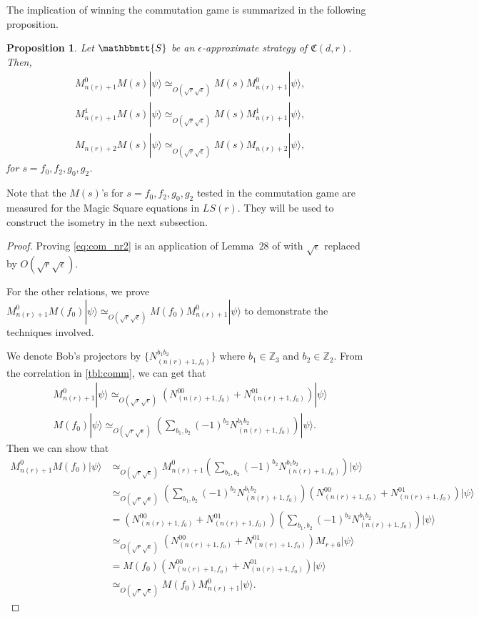 \documentclass[11pt,letterpaper]{article}
\newcommand{\ket}[1]{|#1\rangle}
\newcommand{\Z}{\mathbb{Z}}
\newcommand{\1}{\mathbb{1}}
\newcommand{\LS}{LS}
\newcommand{\nr}{n(r)}
\newcommand{\fC}{\mathfrak{C}}
\newcommand{\bS}{\mathbbmtt{S}}
\newcommand{\ep}{\epsilon}
\newcommand{\se}{\sqrt{\epsilon}}
\newcommand{\sr}{\sqrt{r}}
\newcommand{\appd}[1]{\simeq_{#1}}
\newtheorem{proposition}[theorem]{Proposition}
\theoremstyle{definition}
\begin{document}
The implication of winning the commutation game is summarized in the following proposition.
\begin{proposition}
	\label{prop:rel_comm}
	Let $\bS$ be an $\ep$-approximate strategy of $\fC(d,r)$.
	Then, 
	\begin{align}
		&M_{\nr+1}^0 M(s) \ket{\psi} \appd{O(\sr \se)} M(s) M_{\nr+1}^0 \ket{\psi},\\ 
		&M_{\nr+1}^1 M(s) \ket{\psi} \appd{O(\sr \se)} M(s) M_{\nr+1}^1 \ket{\psi}, \\
		\label{eq:com_nr2} &M_{\nr+2} M(s) \ket{\psi} \appd{O(\sr \se)} M(s) M_{\nr+2} \ket{\psi},
	\end{align}
	for $s = f_0, f_2,g_0,g_2$.
\end{proposition}
Note that the $M(s)$'s for $s = f_0, f_2,g_0,g_2$ tested in the commutation game are measured for the Magic Square equations in $\LS(r)$.
They will be used to construct the isometry in the next subsection.
\begin{proof}
	Proving \cref{eq:com_nr2} is an application of Lemma~$28$ of \cite{coladan2017verifier} with $\se$ replaced by $O(\sr \se)$.
	
	For the other relations, we prove $M_{\nr+1}^0M(f_0) \ket{\psi} \appd{O(\sr \se)} M(f_0)M_{\nr+1}^0 \ket{\psi}$ to demonstrate 
	the techniques involved. 
	
	We denote Bob's projectors by $\{ N_{(\nr+1, f_0)}^{b_1 b_2} \}$ where $b_1 \in \Z_3$ and
	$b_2 \in \Z_2$. From the correlation in \cref{tbl:comm}, 
	we can get that 
	\begin{align*}
		&M_{\nr+1}^0 \ket{\psi} \appd{O(\sr \se)} 
		(N_{(\nr+1, f_0)}^{00} + N_{(\nr+1, f_0)}^{01}) \ket{\psi} \\
		&M(f_0) \ket{\psi} \appd{O(\sr \se)} 
		(\sum_{b_1, b_2} (-1)^{b_2} N_{(\nr+1, f_0)}^{b_1b_2})\ket{\psi}.
	\end{align*}
	Then we can show that
	\begin{align*}
		M_{\nr+1}^0 M(f_0) \ket{\psi} &\appd{O(\sr \se)} M_{\nr+1}^0 (\sum_{b_1, b_2} (-1)^{b_2}N_{(\nr+1,f_0)}^{b_1b_2})\ket{\psi}\\
		&\appd{O(\sr\se)}(\sum_{b_1, b_2} (-1)^{b_2}N_{(\nr+1, f_0)}^{b_1b_2}) 
		(N_{(\nr+1, f_0)}^{00} + N_{(\nr+1, f_0)}^{01}) \ket{\psi} \\
		&= (N_{(\nr+1, f_0)}^{00} + N_{(\nr+1, f_0)}^{01}) (\sum_{b_1, b_2} (-1)^{b_2}N_{(\nr+1, f_0)}^{b_1b_2})  \ket{\psi} \\
		& \appd{O(\sr \se)} (N_{(\nr+1, f_0)}^{00} + N_{(\nr+1, f_0)}^{01}) M_{r+6} \ket{\psi} \\
		&= M(f_0)  (N_{(\nr+1, f_0)}^{00} + N_{(\nr+1, f_0)}^{01}) \ket{\psi} \\
		& \appd{O(\sr\se)} M(f_0)M_{\nr+1}^0 \ket{\psi}.
	\end{align*}
\end{proof}
\end{document}
